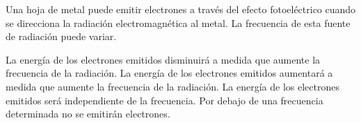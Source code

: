 Una hoja de metal puede emitir electrones a través del efecto fotoeléctrico cuando se direcciona la radiación electromagnética al metal. La frecuencia de esta fuente de radiación puede variar.

\begin{checkboxes}
    \CorrectChoice La energía de los electrones emitidos disminuirá a medida que aumente la frecuencia de la radiación.
    \choice  La energía de los electrones emitidos aumentará a medida que aumente la frecuencia de la radiación.
    \choice  La energía de los electrones emitidos será independiente de la frecuencia.
    \CorrectChoice  Por debajo de una frecuencia determinada no se emitirán electrones.
\end{checkboxes}